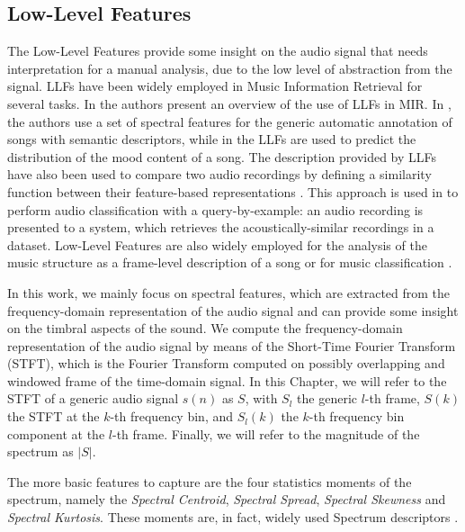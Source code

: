 \subsection{Low-Level Features}\label{sec:LLFs:LLFs}
The Low-Level Features provide some insight on the audio signal that needs interpretation for a manual analysis, due to the low level of abstraction from the signal. %
LLFs have been widely employed in Music Information Retrieval for several tasks. %
In \cite{mckinney2003features,Kim2005} the authors present an overview of the use of LLFs in MIR. In \cite{eck2008automatic}, the authors use a set of spectral features for the generic automatic annotation of songs with semantic descriptors, while in \cite{schmidt2010prediction} the LLFs are used to predict the distribution of the mood content of a song. The description provided by LLFs have also been used to compare two audio recordings by defining a similarity function between their feature-based representations \cite{pampalk2005improvements}. This approach is used in \cite{Kim2004} to perform audio classification with a query-by-example: an audio recording is presented to a system, which retrieves the acoustically-similar recordings in a dataset. Low-Level Features are also widely employed for the analysis of the music structure as a frame-level description of a song \cite{levy2008structural,ong2005semantic,kaiser2012music} or for music classification \cite{Bestagini2013}.

In this work, we mainly focus on spectral features, which are extracted from the frequency-domain representation of the audio signal and can provide some insight on the timbral aspects of the sound. We compute the frequency-domain representation of the audio signal by means of the Short-Time Fourier Transform (STFT), which is the Fourier Transform computed on possibly overlapping and windowed frame of the time-domain signal. In this Chapter, we will refer to the STFT of a generic audio signal $s(n)$ as $S$, with $S_l$ the generic $l$-th frame, $S(k)$ the STFT at the $k$-th frequency bin, and $S_l(k)$ the $k$-th frequency bin component at the $l$-th frame. Finally, we will refer to the magnitude of the spectrum as $|S|$.%

The more basic features to capture are the four statistics moments of the spectrum, namely the \textit{Spectral Centroid}, \textit{Spectral Spread}, \textit{Spectral Skewness} and \textit{Spectral Kurtosis}. These moments are, in fact, widely used Spectrum descriptors \cite{Kim2005,Zanoni2014,Zanoni2012}.

